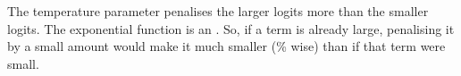 \begin{tcolorbox}[title=Intuition for Temperature]
The temperature parameter penalises the larger logits more than the smaller logits. The exponential function is an . So, if a term is already large, penalising it by a small amount would make it much smaller (\% wise) than if that term were small.
\end{tcolorbox}